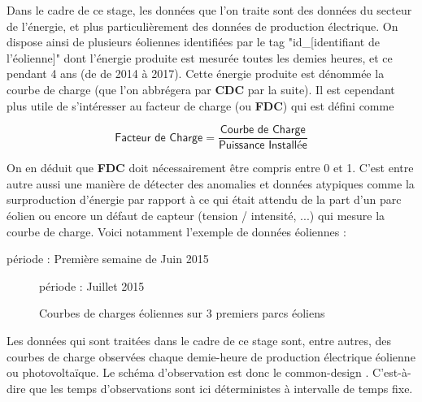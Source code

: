
Dans le cadre de ce stage, les données que l'on traite sont des données du secteur de l'énergie, et plus particulièrement des données de production électrique. On dispose ainsi de plusieurs éoliennes identifiées par le tag "id\_[identifiant de l'éolienne]" dont l'énergie produite est mesurée toutes les demies heures, et ce pendant 4 ans (de de 2014 à 2017).
Cette énergie produite est dénommée la courbe de charge (que l'on abbrégera par \textbf{CDC} par la suite). Il est cependant plus utile de s'intéresser au facteur de charge (ou \textbf{FDC}) qui est défini comme

\begin{equation*}
\displaystyle\textsf{Facteur de Charge} = \frac{\textsf{Courbe de Charge}}{\textsf{Puissance Installée}}
\end{equation*}

On en déduit que \textbf{FDC} doit nécessairement être compris entre 0 et 1. C'est entre autre aussi une manière de détecter des anomalies et données atypiques comme la surproduction d'énergie par rapport à ce qui était attendu de la part d'un parc éolien ou encore un défaut de capteur (tension / intensité, ...) qui mesure la courbe de charge. Voici notamment l'exemple de données éoliennes :


\begin{center}
	période : Première semaine de Juin 2015
	
\end{center}

\begin{figure}[H]
	\centering

	période : Juillet 2015

	\caption{Courbes de charges éoliennes sur 3 premiers parcs éoliens}
	\label{fig:courbes_de_charge}
\end{figure}

\bigskip

Les données qui sont traitées dans le cadre de ce stage sont, entre autres, des courbes de charge observées chaque demie-heure de production électrique éolienne ou photovoltaïque. Le schéma d’observation est donc le \og common-design \fg. C'est-à-dire que les temps d'observations sont ici déterministes à intervalle de temps fixe.